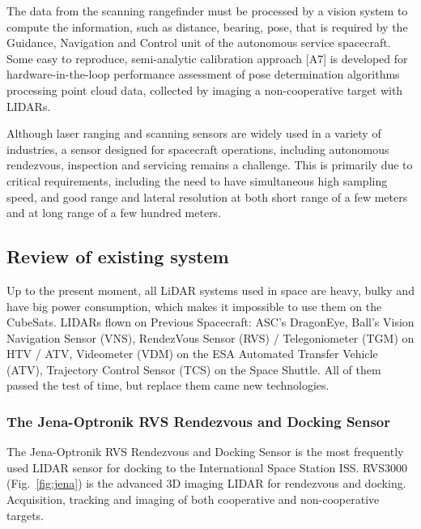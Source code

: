 The data from the scanning rangefinder must be processed by a vision system to compute the information, such as
distance, bearing, pose, that is required by the Guidance, Navigation and Control unit of the autonomous service
spacecraft. Some easy to reproduce, semi-analytic calibration approach [A7] is developed
for hardware-in-the-loop performance assessment of pose determination algorithms processing point
cloud data, collected by imaging a non-cooperative target with LIDARs. 


Although laser ranging and scanning sensors are widely used in a variety of industries, a sensor designed for spacecraft
operations, including autonomous rendezvous, inspection and servicing remains a challenge. This is primarily due to
critical requirements, including the need to have simultaneous high sampling speed, and good range and lateral
resolution at both short range of a few meters and at long range of a few hundred meters.

\subsection{Review of existing system}

Up to the present moment, all LiDAR systems used in space are heavy, bulky and have big power
consumption, which makes it impossible to use them on the CubeSats. 
LIDARs flown on Previous Spacecraft:
ASC’s DragonEye,  Ball’s Vision Navigation Sensor (VNS), RendezVous Sensor (RVS) / Telegoniometer (TGM) on HTV / ATV, Videometer (VDM) on the ESA Automated Transfer Vehicle (ATV), Trajectory Control Sensor (TCS) on the Space Shuttle. All of them passed the test of time, but replace them came new technologies.



\subsubsection{The Jena-Optronik RVS Rendezvous and Docking Sensor}
The Jena-Optronik RVS Rendezvous and Docking Sensor is the most frequently used LIDAR
sensor for docking to the International Space Station ISS.
RVS3000 (Fig.~\ref{fig:jena}) is the advanced 3D imaging LIDAR for rendezvous and docking.
Acquisition, tracking and imaging of both cooperative and non-cooperative targets.

